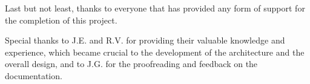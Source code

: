 Last but not least, thanks to everyone that has provided any form of support for the completion of this project.

Special thanks to J.E. and R.V. for providing their valuable knowledge and experience, which became crucial to the development of the architecture and the overall design, and to J.G. for the proofreading and feedback on the documentation.